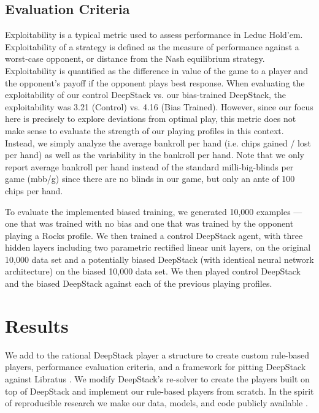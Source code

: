 \documentclass{article}
\begin{document}
\subsection{Evaluation Criteria}
Exploitability is a typical metric used to assess performance in Leduc Hold'em. Exploitability of a strategy is defined as the measure of performance against a worst-case opponent, or distance from the Nash equilibrium strategy. Exploitability is quantified as the difference in value of the game to a player and the opponent’s payoff if the opponent plays best response. When evaluating the exploitability of our control DeepStack vs. our bias-trained DeepStack, the exploitability was 3.21 (Control) vs. 4.16 (Bias Trained). However, since our focus here is precisely to explore deviations from optimal play, this metric does not make sense to evaluate the strength of our playing profiles in this context. Instead, we simply analyze the average bankroll per hand (i.e. chips gained / lost per hand) as well as the variability in the bankroll per hand. Note that we only report average bankroll per hand instead of the standard milli-big-blinds per game (mbb/g) since there are no blinds in our game, but only an ante of 100 chips per hand. %

\indent To evaluate the implemented biased training, we generated 10,000 examples --- one that was trained with no bias and one that was trained by the opponent playing a Rocks profile. We then trained a control DeepStack agent, with three hidden layers including two parametric rectified linear unit layers, on the original 10,000 data set and a potentially biased DeepStack (with identical neural network architecture) on the biased 10,000 data set. We then played control DeepStack and the biased DeepStack against each of the previous playing profiles.

\section{Results}

We add to the rational DeepStack player \cite{leducdeepstack} a structure to create custom rule-based players, performance evaluation criteria, and a framework for pitting DeepStack against Libratus \cite{coms4995f17}.  We modify DeepStack's re-solver to create the players built on top of DeepStack and implement our rule-based players from scratch. %
In the spirit of reproducible research we make our data, models, and code publicly available \cite{aridor19}.
\end{document}
